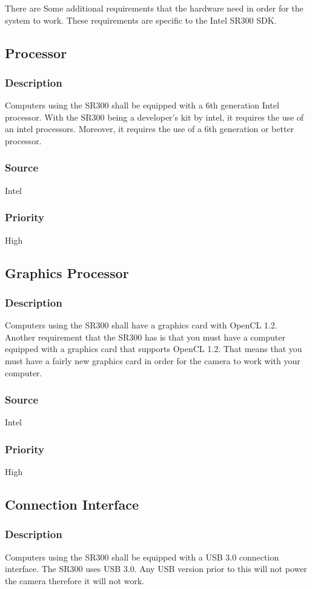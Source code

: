 There are Some additional requirements that the hardware need in order for the system to work.  These requirements are specific to the Intel SR300 SDK. 

\subsection{Processor}
\subsubsection{Description}
Computers using the SR300 shall be equipped with a 6th generation Intel processor.  With the SR300 being a developer's kit by intel, it requires the use of an intel processors.  Moreover, it requires the use of a 6th generation or better processor.
\subsubsection{Source}
Intel
\subsubsection{Priority}
High
\subsection{Graphics Processor}
\subsubsection{Description}
Computers using the SR300 shall have a graphics card with OpenCL 1.2.  Another requirement that the SR300 has is that you must have a computer equipped with a graphics card that supports OpenCL 1.2.  That means that you must have a fairly new graphics card in order for the camera to work with your computer.
\subsubsection{Source}
Intel
\subsubsection{Priority}
High
\subsection{Connection Interface}
\subsubsection{Description}
Computers using the SR300 shall be equipped with a USB 3.0 connection interface.  The SR300 uses USB 3.0.  Any USB version prior to this will not power the camera therefore it will not work.
